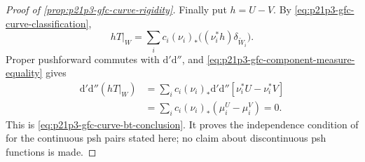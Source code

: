 \begin{proof}[Proof of \cref{prop:p21p3-gfc-curve-rigidity}]
Finally put $h=U-V$.  By
\eqref{eq:p21p3-gfc-curve-classification},
\[
 hT|_W=\sum_i c_i(\nu_i)_*
       \bigl((\nu_i^*h)\delta_{\widetilde W_i}\bigr).
\]
Proper pushforward commutes with $\mathrm d'\mathrm d''$, and
\eqref{eq:p21p3-gfc-component-measure-equality} gives
\begin{align*}
 \mathrm d'\mathrm d''(hT|_W)
 &=\sum_i c_i(\nu_i)_*
       \mathrm d'\mathrm d''[\nu_i^*U-\nu_i^*V] \\
 &=\sum_i c_i(\nu_i)_*(\mu_i^U-\mu_i^V)=0.
\end{align*}
This is \eqref{eq:p21p3-gfc-curve-bt-conclusion}.  It proves the
independence condition of \cite[Definition~8.6.2]{CLD25} for the
continuous psh pairs stated here; no claim about discontinuous psh
functions is made.
\end{proof}




